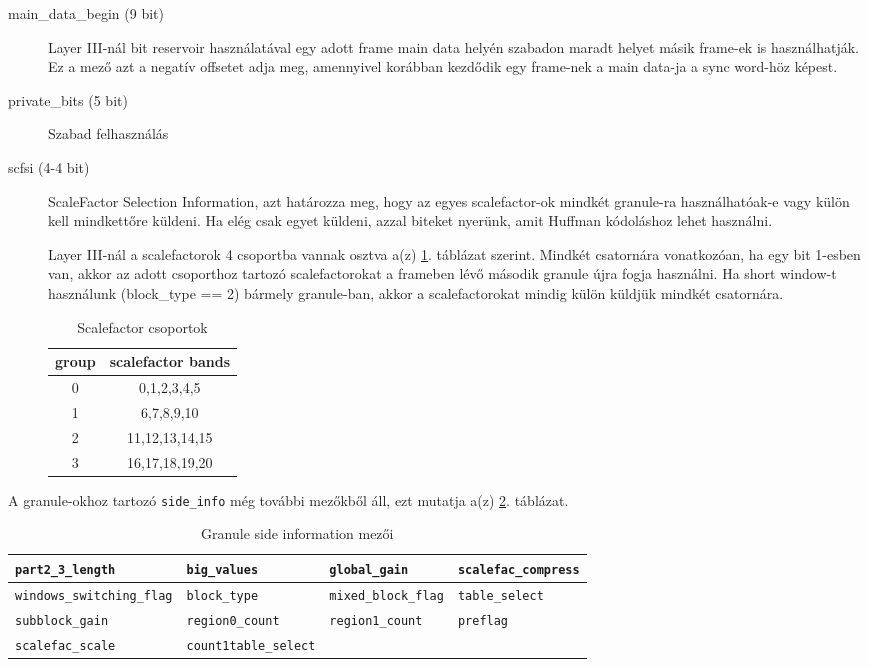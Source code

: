 \documentclass[12pt, a4paper]{article}
\begin{document}
\begin{description}
  \item [main\_data\_begin (9 bit)] Layer III-nál bit reservoir használatával egy adott frame main data helyén szabadon maradt helyet másik frame-ek is használhatják. Ez a mező azt a negatív offsetet adja meg, amennyivel korábban kezdődik egy frame-nek a main data-ja a sync word-höz képest.
  \item [private\_bits (5 bit)] Szabad felhasználás 
  \item [scfsi (4-4 bit)] ScaleFactor Selection Information, azt határozza meg, hogy az egyes scalefactor-ok mindkét granule-ra használhatóak-e vagy külön kell mindkettőre küldeni. Ha elég csak egyet küldeni, azzal biteket nyerünk, amit Huffman kódoláshoz lehet használni.
  
  Layer III-nál a scalefactorok 4 csoportba vannak osztva a(z) \ref{tab:scalefactor-bands}. táblázat szerint. Mindkét csatornára vonatkozóan, ha egy bit 1-esben van, akkor az adott csoporthoz tartozó scalefactorokat a frameben lévő második granule újra fogja használni. Ha short window-t használunk (block\_type == 2) bármely granule-ban, akkor a scalefactorokat mindig külön küldjük mindkét csatornára.
  
  \begin{table}[h]
  \centering
  \footnotesize
  \begin{tabular}{|c|c|}
    \hline
    \textbf{group} & \textbf{scalefactor bands} \\
    \hline
    0 & 0,1,2,3,4,5 \\
    \hline
    1 & 6,7,8,9,10 \\
    \hline
    2 & 11,12,13,14,15 \\
    \hline
    3 & 16,17,18,19,20 \\
    \hline
  \end{tabular}
  \caption{Scalefactor csoportok}
  \label{tab:scalefactor-bands}
  \end{table}
\end{description}

A granule-okhoz tartozó \texttt{side\_info} még további mezőkből áll, ezt mutatja a(z) \ref{tab:granule-side-info}. táblázat.

\begin{table}[h]
\centering
\footnotesize
\begin{tabular}{|l|l|l|l|}
  \hline
  \texttt{part2\_3\_length} & \texttt{big\_values} & \texttt{global\_gain} & \texttt{scalefac\_compress} \\
  \hline
  \texttt{windows\_switching\_flag} & \texttt{block\_type} & \texttt{mixed\_block\_flag} & \texttt{table\_select} \\
  \hline
  \texttt{subblock\_gain} & \texttt{region0\_count} & \texttt{region1\_count} & \texttt{preflag} \\
  \hline
  \texttt{scalefac\_scale} & \texttt{count1table\_select} & \multicolumn{2}{c}{} \\
  \cline{1-2}
\end{tabular}
\caption{Granule side information mezői}
\label{tab:granule-side-info}
\end{table}
\end{document}
